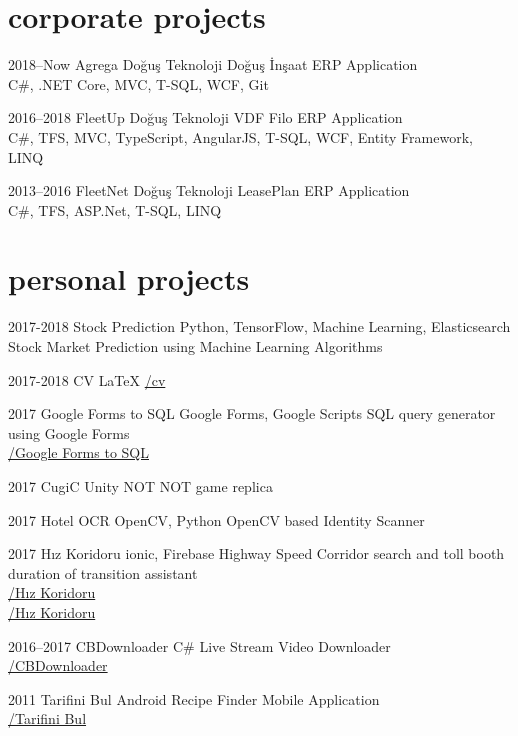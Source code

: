 \documentclass[]{../friggeri-cv} %
\begin{document}
\section{corporate projects}

\begin{entrylist}

\entry
{2018--Now}
{Agrega}
{Doğuş Teknoloji}
{Doğuş İnşaat ERP Application
\\C\#, .NET Core, MVC, T-SQL, WCF, Git}

\entry
{2016--2018}
{FleetUp}
{Doğuş Teknoloji}
{VDF Filo ERP Application
\\C\#, TFS, MVC, TypeScript, AngularJS, T-SQL, WCF, Entity Framework, LINQ}

\entry
{2013--2016}
{FleetNet}
{Doğuş Teknoloji}
{LeasePlan ERP Application
\\C\#, TFS, ASP.Net, T-SQL, LINQ}

\end{entrylist}

\section{personal projects}

\begin{entrylist}

\entry
{2017-2018}
{Stock Prediction}
{Python, TensorFlow, Machine Learning, Elasticsearch}
{Stock Market Prediction using Machine Learning Algorithms}

\entry
{2017-2018}
{CV}
{\LaTeX}
{\href{https://github.com/suphero/cv}{\faGithub/cv}}

\entry
{2017}
{Google Forms to SQL}
{Google Forms, Google Scripts}
{SQL query generator using Google Forms
\\\href{https://github.com/suphero/Google-Forms-to-SQL}{\faGithub/Google Forms to SQL}}

\entry
{2017}
{CugiC}
{Unity}
{NOT NOT game replica}

\entry
{2017}
{Hotel OCR}
{OpenCV, Python}
{OpenCV based Identity Scanner}

\entry
{2017}
{Hız Koridoru}
{ionic, Firebase}
{Highway Speed Corridor search and toll booth duration of transition assistant
\\\href{https://play.google.com/store/apps/details?id=com.harunsokullu.speedcorridor}{\faAndroid/Hız Koridoru}
\\\href{https://itunes.apple.com/tr/app/h\%C4\%B1z-koridoru/id1265151812}{\faApple/Hız Koridoru}}

\entry
{2016--2017}
{CBDownloader}
{C\#}
{Live Stream Video Downloader
\\\href{https://github.com/suphero/CBDownloader}{\faGithub/CBDownloader}}

\entry
{2011}
{Tarifini Bul}
{Android}
{Recipe Finder Mobile Application
\\\href{https://play.google.com/store/apps/details?id=com.tarifinibul}{\faAndroid/Tarifini Bul}}

\end{entrylist}
\end{document}

